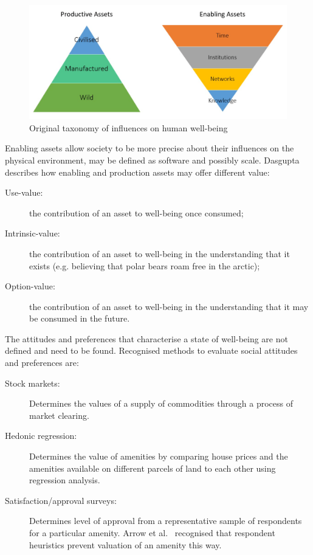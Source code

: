 \documentclass[11pt, oneside]{article}   	%
\begin{document}
\begin{figure}[H]
\begin{center}
\includegraphics[width=1\textwidth]{productiveAssetTaxonomy.png}
\caption{Original taxonomy of influences on human well-being}
\label{Influences on well-being figure}
\end{center}
\end{figure}

Enabling assets allow society to be more precise about their influences on the physical environment, may be defined as software and possibly scale. Dasgupta~\cite{pd2} describes how enabling and production assets may offer different value:

\begin{description}
\item[Use-value:] the contribution of an asset to well-being once consumed;
\item[Intrinsic-value:] the contribution of an asset to well-being in the understanding that it exists (e.g. believing that polar bears roam free in the arctic);
\item[Option-value:] the contribution of an asset to well-being in the understanding that it may be consumed in the future.
\end{description}

The attitudes and preferences that characterise a state of well-being are not defined and need to be found. Recognised methods to evaluate social attitudes and preferences are:

\begin{description}
\item[Stock markets:] Determines the values of a supply of commodities through a process of market clearing.
\item[Hedonic regression:] Determines the value of amenities by comparing house prices and the amenities available on different parcels of land to each other using regression analysis.
\item[Satisfaction/approval surveys:] Determines level of approval from a representative sample of respondents for a particular amenity. Arrow et al.~\cite{kja1} recognised that respondent heuristics prevent valuation of an amenity this way.
\end{description}
\end{document}
